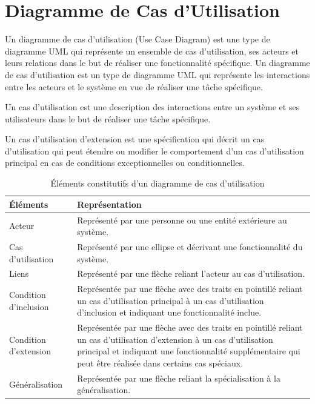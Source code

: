 \newpage
\section{Diagramme de Cas d'Utilisation}\label{sec:diagramme_casutilisation}
\begin{definition}
Un diagramme de cas d'utilisation (Use Case Diagram) est une type de diagramme UML qui représente un ensemble de cas d'utilisation, ses acteurs et leurs relations dans le but de réaliser une fonctionnalité spécifique.
Un diagramme de cas d'utilisation est un type de diagramme UML qui représente les interactions entre les acteurs et le système en vue de réaliser une tâche spécifique. 
\end{definition}
\begin{definition}
Un cas d'utilisation est une description des interactions entre un système et ses utilisateurs dans le but de réaliser une tâche spécifique.
\end{definition}
\begin{definition}
Un cas d'utilisation d'extension est une spécification qui décrit un cas d'utilisation qui peut étendre ou modifier le comportement d'un cas d'utilisation principal en cas de conditions exceptionnelles ou conditionnelles.
\end{definition}


\begin{table}[H]
	\caption{\'El\'ements constitutifs d'un diagramme de cas d'utilisation}
	\label{tbl:diagram_usecase_elements}
	\begin{adjustbox}{max width=\textwidth}
		\begin{tabular}{l|p{40em}}
			\toprule
			\textbf{\'El\'ements} & \textbf{Repr\'esentation}\\
			\midrule
			Acteur & Représenté par une personne ou une entité extérieure au système. \\
			Cas d'utilisation & Représenté par une ellipse et décrivant une fonctionnalité du système. \\
			Liens & Représenté par une flèche reliant l'acteur au cas d'utilisation. \\
			Condition d'inclusion & Représentée par une flèche avec des traits en pointillé reliant un cas d'utilisation principal à un cas d'utilisation d'inclusion et indiquant une fonctionnalité inclue. \\
			Condition d'extension & Représentée par une flèche avec des traits en pointillé reliant un cas d'utilisation d'extension à un cas d'utilisation  principal et indiquant une fonctionnalité supplémentaire qui peut être réalisée dans certains cas spéciaux.\\
			Généralisation & Représentée par une flèche reliant la spécialisation à la généralisation. \\
			\bottomrule
	\end{tabular}
	\end{adjustbox}
\end{table}

